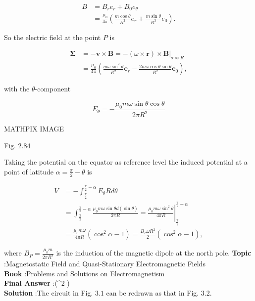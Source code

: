 \documentclass[10pt]{article}
\begin{document}
$$
\begin{aligned}
B &=B_{r} e_{r}+B_{0} e_{\theta} \\
&=\frac{\mu_{0}}{4 \pi}\left(\frac{m \cos \theta}{R^{3}} e_{r}+\frac{m \sin \theta}{R^{3}} e_{0}\right) .
\end{aligned}
$$

So the electric field at the point $P$ is

$$
\begin{aligned}
\boldsymbol{\Sigma} &=-\boldsymbol{v} \times \mathbf{B}=-(\omega \times \mathbf{r}) \times\left.\mathbf{B}\right|_{\sigma \approx R} \\
&=\frac{\mu_{0}}{4 \pi}\left(\frac{m \omega \sin ^{2} \theta}{R^{2}} \mathbf{e}_{r}-\frac{2 m \omega \cos \theta \sin \theta}{R^{2}} \mathbf{e}_{0}\right),
\end{aligned}
$$

with the $\theta$-component

$$
E_{\theta}=-\frac{\mu_{0} m \omega \sin \theta \cos \theta}{2 \pi R^{2}}
$$



MATHPIX IMAGE

Fig. $2.84$

 Taking the potential on the equator as reference level the induced potential at a point of latitude $\alpha=\frac{\pi}{2}-\theta$ is

$$
\begin{aligned}
V &=-\int_{\frac{\pi}{2}}^{\frac{\pi}{2}-\alpha} E_{\theta} R d \theta \\
&=\int_{\frac{\pi}{2}}^{\frac{\pi}{2}-\alpha} \frac{\mu_{0} m \omega \sin \theta d(\sin \theta)}{2 \pi R}=\left.\frac{\mu_{0} m \omega \sin ^{2} \theta}{4 \pi R}\right|_{\frac{\pi}{2}} ^{\frac{\pi}{2}-\alpha} \\
&=\frac{\mu_{0} m \omega}{4 \pi R}\left(\cos ^{2} \alpha-1\right)=\frac{B_{P} \omega R^{2}}{2}\left(\cos ^{2} \alpha-1\right),
\end{aligned}
$$

where $B_{P}=\frac{\mu_{0} m}{2 \pi R^{3}}$ is the induction of the magnetic dipole at the north pole.
\textbf{Topic} :Magnetostatic Field and Quasi-Stationary Electromagnetic Fields\\
\textbf{Book} :Problems and Solutions on Electromagnetism\\
\textbf{Final Answer} :\left(\cos ^{2} \right)\\


\textbf{Solution} :The circuit in Fig. $3.1$ can be redrawn as that in Fig. 3.2.
\end{document}
